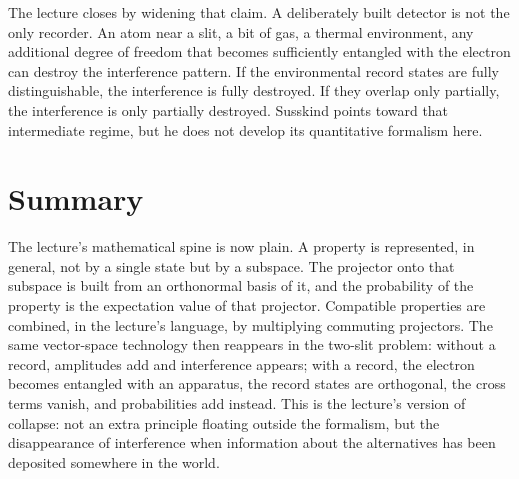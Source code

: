 The lecture closes by widening that claim. A deliberately built detector is not the only recorder. An atom near a slit, a bit of gas, a thermal environment, any additional degree of freedom that becomes sufficiently entangled with the electron can destroy the interference pattern. If the environmental record states are fully distinguishable, the interference is fully destroyed. If they overlap only partially, the interference is only partially destroyed. Susskind points toward that intermediate regime, but he does not develop its quantitative formalism here.

\section{Summary}

The lecture's mathematical spine is now plain. A property is represented, in general, not by a single state but by a subspace. The projector onto that subspace is built from an orthonormal basis of it, and the probability of the property is the expectation value of that projector. Compatible properties are combined, in the lecture's language, by multiplying commuting projectors. The same vector-space technology then reappears in the two-slit problem: without a record, amplitudes add and interference appears; with a record, the electron becomes entangled with an apparatus, the record states are orthogonal, the cross terms vanish, and probabilities add instead. This is the lecture's version of collapse: not an extra principle floating outside the formalism, but the disappearance of interference when information about the alternatives has been deposited somewhere in the world.